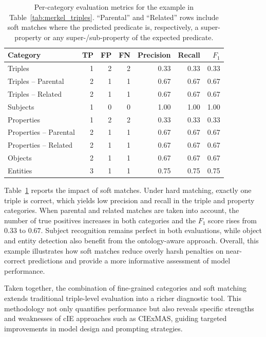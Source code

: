 \documentclass[a4paper,oneside,bibliography=totoc]{scrbook}
\begin{document}
\begin{table}[ht]
  \centering
  \label{tab:merkel_metrics}
  \begin{tabular}{lrrrrrr}
    \toprule
    Category               & TP & FP & FN & Precision & Recall & $F_1$ \\ \midrule
    Triples                & 1  & 2  & 2  & 0.33      & 0.33   & 0.33  \\
    Triples -- Parental    & 2  & 1  & 1  & 0.67      & 0.67   & 0.67  \\
    Triples -- Related     & 2  & 1  & 1  & 0.67      & 0.67   & 0.67  \\
    Subjects               & 1  & 0  & 0  & 1.00      & 1.00   & 1.00  \\
    Properties             & 1  & 2  & 2  & 0.33      & 0.33   & 0.33  \\
    Properties -- Parental & 2  & 1  & 1  & 0.67      & 0.67   & 0.67  \\
    Properties -- Related  & 2  & 1  & 1  & 0.67      & 0.67   & 0.67  \\
    Objects                & 2  & 1  & 1  & 0.67      & 0.67   & 0.67  \\
    Entities               & 3  & 1  & 1  & 0.75      & 0.75   & 0.75  \\
    \bottomrule
  \end{tabular}
  \caption{Per-category evaluation metrics for the example in Table~\ref{tab:merkel_triples}. ``Parental'' and ``Related'' rows include soft matches where the predicted predicate is, respectively, a super-property or any super-/sub-property of the expected predicate.}
\end{table}

Table~\ref{tab:merkel_metrics} reports the impact of soft matches. Under hard matching, exactly one triple is correct, which yields low precision and recall in the triple and property categories. When parental and related matches are taken into account, the number of true positives increases in both categories and the $F_1$ score rises from $0.33$ to $0.67$. Subject recognition remains perfect in both evaluations, while object and entity detection also benefit from the ontology-aware approach. Overall, this example illustrates how soft matches reduce overly harsh penalties on near-correct predictions and provide a more informative assessment of model performance.

Taken together, the combination of fine-grained categories and soft matching extends traditional triple-level evaluation into a richer diagnostic tool. This methodology not only quantifies performance but also reveals specific strengths and weaknesses of \ac{cIE} approaches such as CIExMAS, guiding targeted improvements in model design and prompting strategies.
\end{document}
